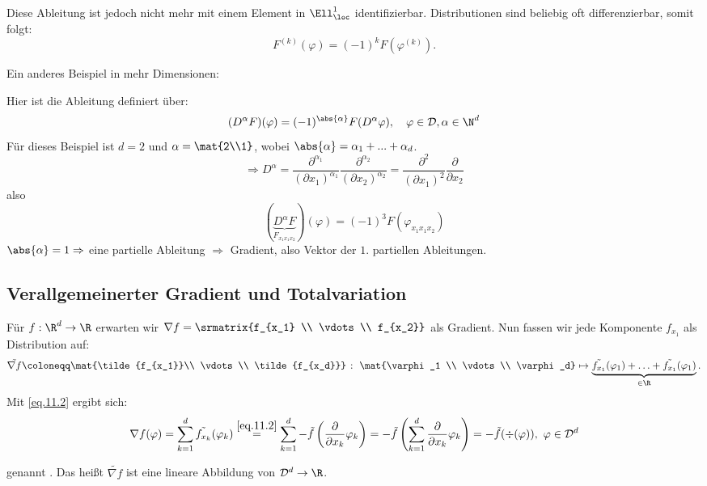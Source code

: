 Diese Ableitung ist jedoch nicht mehr mit einem Element in $\Ell^1_{\loc}$ identifizierbar.
Distributionen sind beliebig oft differenzierbar, somit folgt:
\[F^{(k)}(\varphi) = (-1)^kF(\varphi^{(k)}).\]

Ein anderes Beispiel in mehr Dimensionen:

Hier ist die Ableitung definiert über:
\[(D^\alpha F)(\varphi) = (-1)^{\abs{\alpha}}F(D^{\alpha} \varphi), \quad \varphi \in \mathcal{D}, \alpha \in \N^d\]
Für dieses Beispiel ist $d=2$ und $\alpha = \mat{2\\1}$, wobei $\abs{\alpha} = \alpha_1 + ... +\alpha_d$.
\[\Rightarrow D^\alpha = \frac{\partial^{\alpha_1}}{(\partial x_1)^{\alpha_1}}\frac{\partial^{\alpha_2}}{(\partial x_2)^{\alpha_2}} = \frac{\partial^{2}}{(\partial x_1)^{2}} \frac{\partial}{\partial x_2}\]
also
\[(\underbrace{D^\alpha F}_{F_{x_1 x_1 x_2}})(\varphi) = (-1)^{3}F(\varphi_{x_1 x_1 x_2})\]
$\abs{\alpha}=1 \Rightarrow $ eine partielle Ableitung $\Rightarrow$ Gradient, also Vektor der $1.$ partiellen Ableitungen.

\subsection{Verallgemeinerter Gradient und Totalvariation}

Für $f:\R^d \to \R$ erwarten wir $\nabla f = \srmatrix{f_{x_1} \\ \vdots \\ f_{x_2}}$ als Gradient.
Nun fassen wir jede Komponente $f_{x_1}$ als Distribution auf:
\[
    \tilde{\nabla f} \coloneqq \mat{\tilde{f_{x_1}}\\ \vdots \\ \tilde{f_{x_d}}} \;\colon\; \mat{\varphi_1 \\ \vdots \\ \varphi_d} \mapsto \underbrace{\tilde{f_{x_1}}(\varphi_1) + \hdots + \tilde{f_{x_1}}(\varphi_1)}_{\in \R}.
\]
Mit \eqref{eq.11.2} ergibt sich:
\begin{equation}\label{eq.11.3}
    \nabla f(\varphi)
    =\sum_{k=1}^d \tilde{f_{x_k}}(\varphi_k) 
    \overset{\eqref{eq.11.2}}{=} \sum_{k=1}^d - \tilde{f}\left(\frac{\partial}{\partial x_k} \varphi_k \right) 
    = -\tilde{f} \left( \sum_{k=1}^d \frac{\partial}{\partial x_k} \varphi_k \right) 
    = - \tilde f (\div(\varphi)), \ \varphi \in \mathcal{D}^d
\end{equation}

genannt . Das heißt $\tilde{\nabla f}$ ist eine lineare Abbildung von $\D^d \to \R$.


